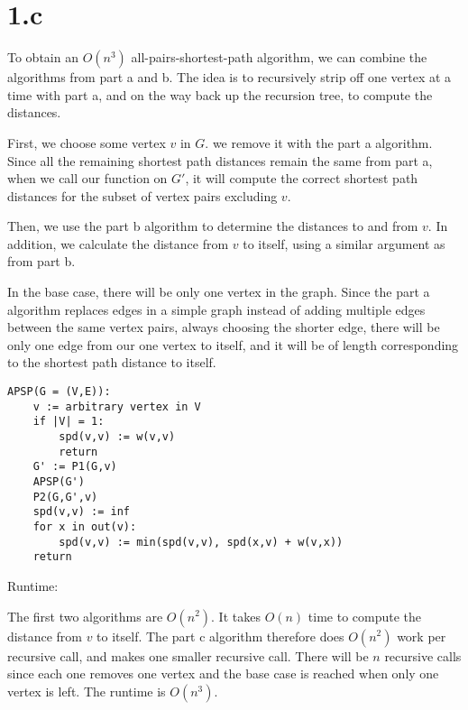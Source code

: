 \documentclass{article}
\begin{document}
\section*{1.c}

To obtain an $O(n^3)$ all-pairs-shortest-path algorithm, we can combine the
algorithms from part a and b. The idea is to recursively strip off one vertex
at a time with part a, and on the way back up the recursion tree, to compute
the distances.

First, we choose some vertex $v$ in $G$. we remove it with the part a
algorithm. Since all the remaining shortest path distances remain the same
from part a, when we call our function on $G'$, it will compute the correct
shortest path distances for the subset of vertex pairs excluding $v$.

Then, we use the part b algorithm to determine the distances to and from $v$.
In addition, we calculate the distance from $v$ to itself, using a similar
argument as from part b.

In the base case, there will be only one vertex in the graph. Since the part a
algorithm replaces edges in a simple graph instead of adding multiple edges
between the same vertex pairs, always choosing the shorter edge, there will be
only one edge from our one vertex to itself, and it will be of length
corresponding to the shortest path distance to itself.

\begin{verbatim}
APSP(G = (V,E)):
    v := arbitrary vertex in V
    if |V| = 1:
        spd(v,v) := w(v,v)
        return
    G' := P1(G,v)
    APSP(G')
    P2(G,G',v)
    spd(v,v) := inf
    for x in out(v):
        spd(v,v) := min(spd(v,v), spd(x,v) + w(v,x))
    return 
\end{verbatim}

Runtime:

The first two algorithms are $O(n^2)$. It takes $O(n)$ time to compute the
distance from $v$ to itself. The part c algorithm therefore does $O(n^2)$
work per recursive call, and makes one smaller recursive call. There will be
$n$ recursive calls since each one removes one vertex and the base case is
reached when only one vertex is left. The runtime is $O(n^3)$.
\end{document}
